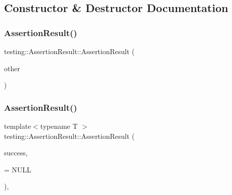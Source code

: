\subsection{Constructor \& Destructor Documentation}
\mbox{\label{classtesting_1_1_assertion_result_a27788116f03f90aec4daf592fd809ead}} 
\subsubsection{\texorpdfstring{AssertionResult()}{AssertionResult()}\hspace{0.1cm}{\footnotesize\ttfamily [1/2]}}
{\footnotesize\ttfamily testing\+::\+Assertion\+Result\+::\+Assertion\+Result (\begin{DoxyParamCaption}\item[{const \mbox{\hyperlink{classtesting_1_1_assertion_result}{Assertion\+Result}} \&}]{other }\end{DoxyParamCaption})}

\mbox{\label{classtesting_1_1_assertion_result_a9b8d1d6d0a979d0769ed4ff97d06c4e3}} 
\subsubsection{\texorpdfstring{AssertionResult()}{AssertionResult()}\hspace{0.1cm}{\footnotesize\ttfamily [2/2]}}
{\footnotesize\ttfamily template$<$typename T $>$ \\
testing\+::\+Assertion\+Result\+::\+Assertion\+Result (\begin{DoxyParamCaption}\item[{const T \&}]{success,  }\item[{typename \mbox{\hyperlink{structtesting_1_1internal_1_1_enable_if}{internal\+::\+Enable\+If}}$<$ !\mbox{\hyperlink{classtesting_1_1internal_1_1_implicitly_convertible}{internal\+::\+Implicitly\+Convertible}}$<$ T, \mbox{\hyperlink{classtesting_1_1_assertion_result}{Assertion\+Result}} $>$\+::value $>$\+::type $\ast$}]{ = {\ttfamily NULL} }\end{DoxyParamCaption})\hspace{0.3cm}{\ttfamily [inline]}, {\ttfamily [explicit]}}



